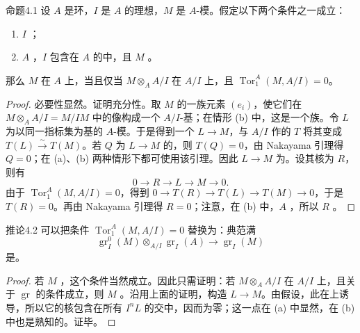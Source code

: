 \begin{SGAresult}{命题}{4.1}
设 $A$ 是环，$I$ 是 $A$ 的理想，$M$ 是 $A$-模。假定以下两个条件之一成立：
\begin{enumerate}
\item[(a)] $I$ ；
\item[(b)] $A$ ，$I$ 包含在 $A$ 的中，且 $M$ 。
\end{enumerate}
那么 $M$ 在 $A$ 上，当且仅当 $M\otimes_A A/I$ 在 $A/I$ 上，且 $\operatorname{Tor}_1^A(M,A/I)=0$。
\end{SGAresult}

\begin{proof}
必要性显然。证明充分性。取 $M$ 的一族元素 $(e_i)$，使它们在 $M\otimes_A A/I=M/IM$ 中的像构成一个 $A/I$-基；在情形 (b) 中，这是一个族。令 $L$ 为以同一指标集为基的 $A$-模。于是得到一个 $L\to M$，与 $A/I$ 作的 $T$ 将其变成 $T(L)\xrightarrow{\sim}T(M)$。若 $Q$ 为 $L\to M$ 的，则 $T(Q)=0$，由 Nakayama 引理得 $Q=0$；在 (a)、(b) 两种情形下都可使用该引理。因此 $L\to M$ 为。设其核为 $R$，则有
\[
0\longrightarrow R\longrightarrow L\longrightarrow M\longrightarrow0.
\]
由于 $\operatorname{Tor}_1^A(M,A/I)=0$，得到
$0\to T(R)\to T(L)\to T(M)\to0$，于是 $T(R)=0$。再由 Nakayama 引理得 $R=0$；注意，在 (b) 中，$A$ ，所以 $R$ 。
\end{proof}

\begin{SGAresult}{推论}{4.2}
可以把条件 $\operatorname{Tor}_1^A(M,A/I)=0$ 替换为：典范满
\[
\operatorname{gr}_I^0(M)\otimes_{A/I}\operatorname{gr}_I(A)
\longrightarrow\operatorname{gr}_I(M)\tag{$*$}
\]
是。
\end{SGAresult}
\begin{proof}
若 $M$ ，这个条件当然成立。因此只需证明：若 $M\otimes_A A/I$ 在 $A/I$ 上，且关于 $\operatorname{gr}$ 的条件成立，则 $M$ 。沿用上面的证明，构造 $L\to M$。由假设，此在上诱导，所以它的核包含在所有 $I^nL$ 的交中，因而为零；这一点在 (a) 中显然，在 (b) 中也是熟知的。证毕。
\end{proof}


